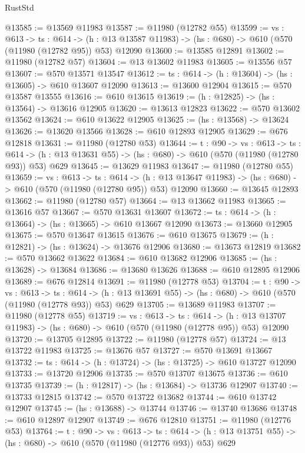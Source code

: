 \begin{lexlean}{RustStd}
\begin{coremodule}
@13585 := @13569 @11983
@13587 := @11980 (@12782 @55)
@13599 := {vs : @613} ->
  {ts : @614} ->
  (h : @13 @13587 @11983) -> (hs : @680) -> @610 (@570 (@11980 (@12782 @95)) @53) @12090
@13600 := @13585 @12891
@13602 := @11980 (@12782 @57)
@13604 := @13 @13602 @11983
@13605 := @13556 @57
@13607 := @570 @13571 @13547
@13612 := {ts : @614} -> (h : @13604) -> (hs : @13605) -> @610 @13607 @12090
@13613 := @13600 @12904
@13615 := @570 @13587 @13555
@13616 := @610 @13615
@13619 := (h : @12825) -> (hs : @13564) -> @13616 @12905
@13620 := @13613 @12823
@13622 := @570 @13602 @13562
@13624 := @610 @13622 @12905
@13625 := (hs : @13568) -> @13624
@13626 := @13620 @13566
@13628 := @610 @12893 @12905
@13629 := @676 @12818
@13631 := @11980 (@12780 @53)
@13644 := {t : @90} ->
  {vs : @613} ->
  {ts : @614} -> (h : @13 @13631 @55) -> (hs : @680) -> @610 (@570 (@11980 (@12780 @93)) @53) @629
@13645 := @13629 @11983
@13647 := @11980 (@12780 @55)
@13659 := {vs : @613} ->
  {ts : @614} ->
  (h : @13 @13647 @11983) -> (hs : @680) -> @610 (@570 (@11980 (@12780 @95)) @53) @12090
@13660 := @13645 @12893
@13662 := @11980 (@12780 @57)
@13664 := @13 @13662 @11983
@13665 := @13616 @57
@13667 := @570 @13631 @13607
@13672 := {ts : @614} -> (h : @13664) -> (hs : @13665) -> @610 @13667 @12090
@13673 := @13660 @12905
@13675 := @570 @13647 @13615
@13676 := @610 @13675
@13679 := (h : @12821) -> (hs : @13624) -> @13676 @12906
@13680 := @13673 @12819
@13682 := @570 @13662 @13622
@13684 := @610 @13682 @12906
@13685 := (hs : @13628) -> @13684
@13686 := @13680 @13626
@13688 := @610 @12895 @12906
@13689 := @676 @12814
@13691 := @11980 (@12778 @53)
@13704 := {t : @90} ->
  {vs : @613} ->
  {ts : @614} -> (h : @13 @13691 @55) -> (hs : @680) -> @610 (@570 (@11980 (@12778 @93)) @53) @629
@13705 := @13689 @11983
@13707 := @11980 (@12778 @55)
@13719 := {vs : @613} ->
  {ts : @614} ->
  (h : @13 @13707 @11983) -> (hs : @680) -> @610 (@570 (@11980 (@12778 @95)) @53) @12090
@13720 := @13705 @12895
@13722 := @11980 (@12778 @57)
@13724 := @13 @13722 @11983
@13725 := @13676 @57
@13727 := @570 @13691 @13667
@13732 := {ts : @614} -> (h : @13724) -> (hs : @13725) -> @610 @13727 @12090
@13733 := @13720 @12906
@13735 := @570 @13707 @13675
@13736 := @610 @13735
@13739 := (h : @12817) -> (hs : @13684) -> @13736 @12907
@13740 := @13733 @12815
@13742 := @570 @13722 @13682
@13744 := @610 @13742 @12907
@13745 := (hs : @13688) -> @13744
@13746 := @13740 @13686
@13748 := @610 @12897 @12907
@13749 := @676 @12810
@13751 := @11980 (@12776 @53)
@13764 := {t : @90} ->
  {vs : @613} ->
  {ts : @614} -> (h : @13 @13751 @55) -> (hs : @680) -> @610 (@570 (@11980 (@12776 @93)) @53) @629

\end{coremodule}
\end{lexlean}
